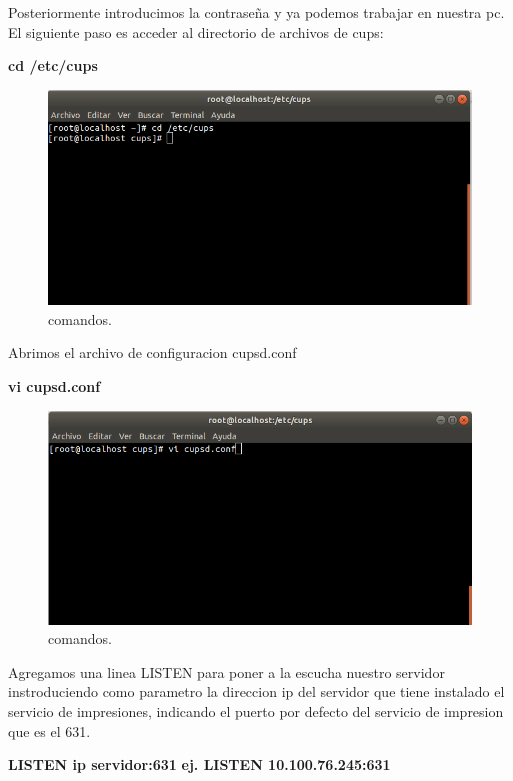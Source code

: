 Posteriormente introducimos la contraseña y ya podemos trabajar en nuestra pc.
El siguiente paso es acceder al directorio de archivos de cups:
\\
\begin{center}
						\textbf{cd /etc/cups}
\end {center}
\FloatBarrier
\begin{figure}[htbp!]
		\centering
			\includegraphics[width=.9\textwidth]{images/r3}
		\caption{comandos.}
		\label{image:r3}
\end{figure}
\FloatBarrier
Abrimos el archivo de configuracion cupsd.conf
\\
\begin{center}
\textbf{vi cupsd.conf}
\end {center}
\FloatBarrier
\begin{figure}[htbp!]
		\centering
			\includegraphics[width=.9\textwidth]{images/r4}
		\caption{comandos.}
		\label{image:r4}
\end{figure}
\FloatBarrier
Agregamos una linea LISTEN para poner a la escucha nuestro servidor instroduciendo como parametro la direccion ip del servidor que tiene instalado el servicio de impresiones, indicando el puerto por defecto del servicio de impresion que es el 631.
\\
\begin{center}
					\textbf{LISTEN ip servidor:631}
					\textbf{ej. LISTEN 10.100.76.245:631}
\end {center}
